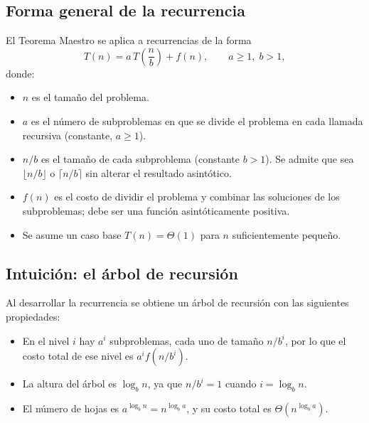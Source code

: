 \documentclass{article}
\begin{document}
        \subsection{Forma general de la recurrencia}
        
        El Teorema Maestro se aplica a recurrencias de la forma
        \[
        T(n) = a\,T\!\left(\frac{n}{b}\right) + f(n),
        \qquad a \geq 1,\; b > 1,
        \]
        donde:
        
        \begin{itemize}
        \item $n$ es el tamaño del problema.
        \item $a$ es el número de subproblemas en que se divide el problema en cada
                llamada recursiva (constante, $a \geq 1$).
        \item $n/b$ es el tamaño de cada subproblema (constante $b > 1$). Se admite
                que sea $\lfloor n/b \rfloor$ o $\lceil n/b \rceil$ sin alterar el
                resultado asintótico.
        \item $f(n)$ es el costo de dividir el problema y combinar las soluciones de
                los subproblemas; debe ser una función asintóticamente positiva.
        \item Se asume un caso base $T(n) = \Theta(1)$ para $n$ suficientemente
                pequeño.
        \end{itemize}
        
        \subsection{Intuición: el árbol de recursión}
        
        Al desarrollar la recurrencia se obtiene un árbol de recursión con las
        siguientes propiedades:
        
        \begin{itemize}
        \item En el nivel $i$ hay $a^i$ subproblemas, cada uno de tamaño $n/b^i$,
                por lo que el costo total de ese nivel es $a^i f(n/b^i)$.
        \item La altura del árbol es $\log_b n$, ya que $n/b^i = 1$ cuando
                $i = \log_b n$.
        \item El número de hojas es $a^{\log_b n} = n^{\log_b a}$, y su costo total
                es $\Theta\!\left(n^{\log_b a}\right)$.
        \end{itemize}
        
\end{document}
